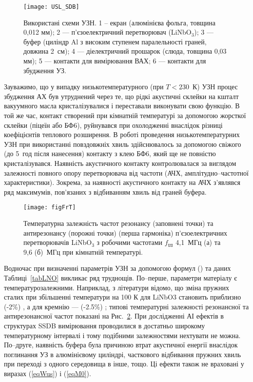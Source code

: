 \documentclass[a4paper,14pt,oneside,openany]{memoir}
\begin{document}
\begin{figure}[b]
\center
\texttt{[image: USL\_SDB]}%
\caption{\label{figUSL:SDB}
Використані схеми УЗН.
1 --  екран (алюмінієва фольга, товщина 0,012 мм);
2 --- п'єзоелектричний перетворювач (LiNbO$_3$);
3 --- буфер (циліндр Al з високим ступенем паралельності граней, довжина 2~см);
4 --- діелектричний прошарок (слюда, товщина 0,03 мм);
5 --- контакти для вимірювання ВАХ;
6 --- контакти для збудження УЗ.
}
\end{figure}


Зауважимо, що у випадку низькотемпературного (при $T<230$~К) УЗН процес збудження АХ був утруднений через те, що
рідкі акустичні склейки на кшталт вакуумного масла кристалізувалися і переставали виконувати свою функцію.
В той же час, контакт створений при кімнатній температурі за допомогою жорсткої склейки (піцеїн або БФ6),
руйнувався при охолодженні внаслідок різниці коефіцієнтів теплового розширення.
В роботі проведення низькотемпературних УЗН при використанні повздовжніх хвиль здійснювалось за допомогою свіжого (до 5~год після нанесення) контакту з клею БФ6,
який ще не повністю кристалізувався.
Наявність акустичного контакту контролювалася за виглядом залежності повного опору перетворювача від частоти (АЧХ, амплітудно--частотної характеристики).
Зокрема, за наявності акустичного контакту на АЧХ з'являвся ряд максимумів, пов'язаних з відбиванням хвиль від граней буфера.

\begin{figure}
\center
\texttt{[image: figFrT]}%
\caption{\label{figFrT}
Температурна залежність частот резонансу (заповнені точки) та антирезонансу (порожні точки) (перша гармоніка)
п'єзоелектричних перетворювачів LiNbO$_3$ з робочими частотами $f_\mathtt{US}$ 4,1~МГц (а) та 9,6 (б)~МГц при кімнатній температурі.
}
\end{figure}


Водночас при визначенні параметрів УЗН за допомогою формул () та даних Таблиці~\ref{tabLNO} викликає ряд труднощів.
По--перше, параметри матеріалу є температурозалежними.
Наприклад, з літератури відомо, що зміна пружних сталих при збільшенні температури на 100 К для LiNbO3 становить приблизно (-2\%) \cite{LNO_C:Temp},
а для кремнію --- (-2.5\%) \cite{Si_C:Temp};
типові температурні залежності резонансної та антирезонансної частот показані на Рис.~\ref{figFrT}.
При дослідженні АІ ефектів в структурах SSDB вимірювання проводилися в достатньо широкому температурному інтервалі і тому подібними залежностями нехтувати не можна.
По--друге, наявність буфера була причиною втрат акустичної енергії внаслідок поглинання УЗ в алюмінієвому циліндрі, часткового відбивання пружних хвиль
при переході з одного середовища в інше, тощо.
Ці ефекти також не враховані у виразах (\ref{eqWus}) і  (\ref{eqM0}).
\end{document}
